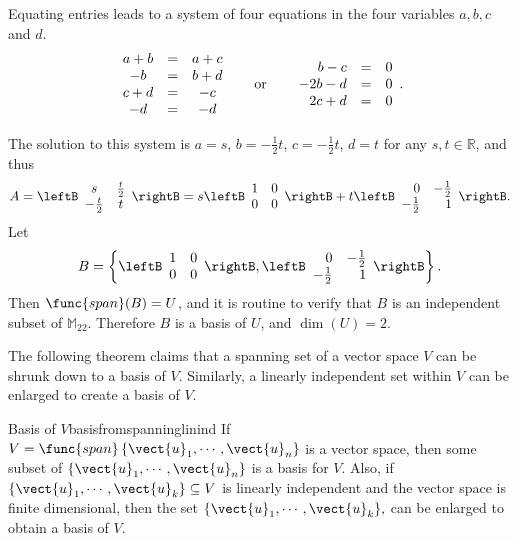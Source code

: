\begin{solution}
Equating entries leads to a system of four equations in the four
variables $a,b,c$ and $d$.
\[ \begin{array}{ccc}
a+b & = & a + c \\
-b & = & b + d \\
c + d & = & -c \\
-d & = & -d \end{array} \hspace*{.2in}\mbox{ or }\hspace*{.2in}
\begin{array}{rcc}
b - c & = & 0 \\
-2b - d & = & 0 \\
2c + d & = & 0 
\end{array}.  \] 

The solution to this system is
$a=s$, $b=-\frac{1}{2}t$, $c=-\frac{1}{2}t$,  $d=t$ for any $s,t\in\mathbb{R}$, 
and thus 
\[ A=\leftB\begin{array}{cc} s & \frac{t}{2} \\
-\frac{t}{2} & t \end{array}\rightB
= s\leftB\begin{array}{cc} 1 & 0 \\ 0 & 0 \end{array}\rightB
+ t\leftB\begin{array}{rr} 0  & -\frac{1}{2} \\ 
-\frac{1}{2} & 1 \end{array}\rightB .\]
Let 
\[ B=\left\{ 
\leftB\begin{array}{cc} 1 & 0 \\ 0 & 0 \end{array}\rightB,
\leftB\begin{array}{rr} 0  & -\frac{1}{2} \\
-\frac{1}{2} & 1 \end{array}\rightB\right\}.\]
Then $\func{span}(B)=U$, and it is routine to verify that $B$ is
an independent subset of $\mathbb{M}_{22}$.  
Therefore $B$ is a basis of $U$, and $\dim(U)=2$.
\end{solution}

The following theorem claims that a spanning set of a vector space $V$ can be shrunk down to a basis of $V$. Similarly, a linearly independent set within $V$ can be enlarged to create a basis of $V$.

\begin{theorem}{Basis of $V$}{basisfromspanninglinind}
 If $V=\func{span}\left\{ \vect{u}_{1},\cdots ,\vect{u}
_{n}\right\} $ is a vector space, then some subset of $\{\vect{u}_{1},\cdots ,\vect{u}_{n}\}$
is a basis for $V.$ Also, if $\{\vect{u}_{1},\cdots ,\vect{u}
_{k}\}\subseteq V$ is linearly independent and the vector space is finite
dimensional,
 then the set $\{
\vect{u}_{1},\cdots ,\vect{u}_{k}\},$ can be enlarged to obtain a basis
of $V.$
\end{theorem}

